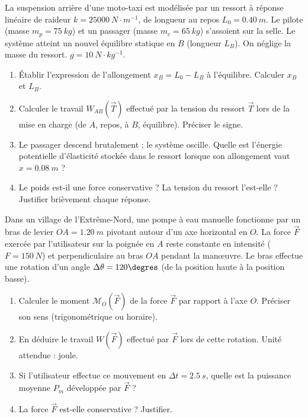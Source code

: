 \documentclass[11pt]{article}
\begin{document}
\begin{exercice}
La suspension arrière d'une moto-taxi est modélisée par un ressort à réponse linéaire de raideur $k = \SI{25000}{N\cdot m^{-1}}$, de longueur au repos $L_0 = \SI{0,40}{m}$. Le pilote (masse $m_p = \SI{75}{kg}$) et un passager (masse $m_c = \SI{65}{kg}$) s'assoient sur la selle. Le système atteint un nouvel équilibre statique en $B$ (longueur $L_B$). On néglige la masse du ressort. $g = \SI{10}{N\cdot kg^{-1}}$.
\begin{enumerate}
    \item Établir l'expression de l'allongement $x_B = L_0 - L_B$ à l'équilibre. Calculer $x_B$ et $L_B$.
    \item Calculer le travail $W_{AB}(\vec{T})$ effectué par la tension du ressort $\vec{T}$ lors de la mise en charge (de $A$, repos, à $B$, équilibre). Préciser le signe.
    \item Le passager descend brutalement ; le système oscille. Quelle est l'énergie potentielle d'élasticité stockée dans le ressort lorsque son allongement vaut $x = \SI{0,08}{m}$ ?
    \item Le poids est-il une force conservative ? La tension du ressort l'est-elle ? Justifier brièvement chaque réponse.
\end{enumerate}
\end{exercice}

\begin{exercice}
Dans un village de l'Extrême-Nord, une pompe à eau manuelle fonctionne par un bras de levier $OA = \SI{1,20}{m}$ pivotant autour d'un axe horizontal en $O$. La force $\vec{F}$ exercée par l'utilisateur sur la poignée en $A$ reste constante en intensité ($F = \SI{150}{N}$) et perpendiculaire au bras $OA$ pendant la manœuvre. Le bras effectue une rotation d'un angle $\Delta\theta = 120\degres$ (de la position haute à la position basse).
\begin{enumerate}
    \item Calculer le moment $\mathcal{M}_O(\vec{F})$ de la force $\vec{F}$ par rapport à l'axe $O$. Préciser son sens (trigonométrique ou horaire).
    \item En déduire le travail $W(\vec{F})$ effectué par $\vec{F}$ lors de cette rotation. Unité attendue : joule.
    \item Si l'utilisateur effectue ce mouvement en $\Delta t = \SI{2,5}{s}$, quelle est la puissance moyenne $P_m$ développée par $\vec{F}$ ?
    \item La force $\vec{F}$ est-elle conservative ? Justifier.
\end{enumerate}
\end{exercice}
\end{document}
